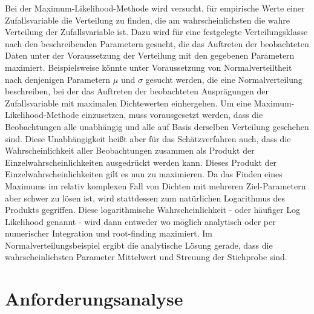 \documentclass[
  12pt,
  openany]{book}
\begin{document}
Bei der Maximum-Likelihood-Methode wird versucht, für empirische Werte einer Zufallsvariable die Verteilung zu finden, die am wahrscheinlichsten die wahre Verteilung der Zufallsvariable ist. Dazu wird für eine festgelegte Verteilungsklasse nach den beschreibenden Parametern gesucht, die das Auftreten der beobachteten Daten unter der Voraussetzung der Verteilung mit den gegebenen Parametern maximiert. Beispielsweise könnte unter Voraussetzung von Normalverteiltheit nach denjenigen Parametern \(\mu\) und \(\sigma\) gesucht werden, die eine Normalverteilung beschreiben, bei der das Auftreten der beobachteten Ausprägungen der Zufallsvariable mit maximalen Dichtewerten einhergehen.
Um eine Maximum-Likelihood-Methode einzusetzen, muss vorausgesetzt werden, dass die Beobachtungen alle unabhängig und alle auf Basis derselben Verteilung geschehen sind. Diese Unabhängigkeit heißt aber für das Schätzverfahren auch, dass die Wahrscheinlichkeit aller Beobachtungen zusammen als Produkt der Einzelwahrscheinlichkeiten ausgedrückt werden kann. Dieses Produkt der Einzelwahrscheinlichkeiten gilt es nun zu maximieren.
Da das Finden eines Maximums im relativ komplexen Fall von Dichten mit mehreren Ziel-Parametern aber schwer zu lösen ist, wird stattdessen zum natürlichen Logarithmus des Produkts gegriffen.
Diese logarithmische Wahrscheinlichkeit - oder häufiger Log Likelihood genannt - wird dann entweder wo möglich analytisch oder per numerischer Integration und root-finding maximiert. Im Normalverteilungsbeispiel ergibt die analytische Lösung gerade, dass die wahrscheinlichsten Parameter Mittelwert und Streuung der Stichprobe sind.

\hypertarget{anforderungsanalyse}{%
\chapter{Anforderungsanalyse}\label{anforderungsanalyse}}
\end{document}
